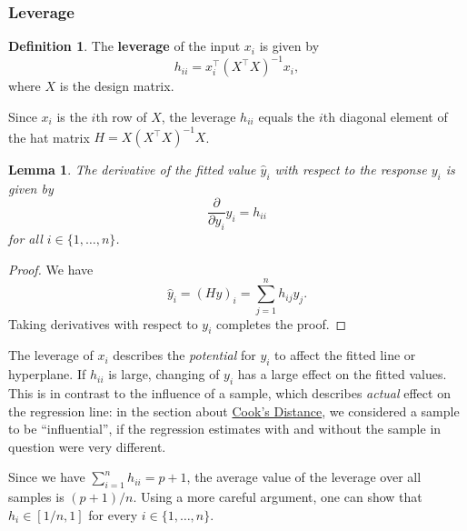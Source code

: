 \documentclass[
  a4paper,
]{article}
\newtheorem{lemma}{Lemma}[section]
\theoremstyle{definition}
\newtheorem{definition}{Definition}[section]
\theoremstyle{definition}
\theoremstyle{definition}
\theoremstyle{definition}
\theoremstyle{remark}
\begin{document}
\hypertarget{leverage}{%
\subsubsection{Leverage}\label{leverage}}

\begin{definition}
The \textbf{leverage} of the input \(x_i\) is given by
\begin{equation*}
  h_{ii}
  = x_i^\top (X^\top X)^{-1} x_i,
\end{equation*}
where \(X\) is the design matrix.
\end{definition}

Since \(x_i\) is the \(i\)th row of \(X\), the leverage \(h_{ii}\) equals the \(i\)th
diagonal element of the hat matrix \(H = X (X^\top X)^{-1} X\).

\begin{lemma}
The derivative of the fitted value \(\hat y_i\) with respect to the
response \(y_i\) is given by
\begin{equation*}
  \frac{\partial}{\partial y_i} \hat y_i
  = h_{ii}
\end{equation*}
for all \(i\in \{1, \ldots, n\}\).
\end{lemma}

\begin{proof}
We have
\begin{equation*}
  \hat y_i
  = (H y)_i
  = \sum_{j=1}^n h_{ij} y_j.
\end{equation*}
Taking derivatives with respect to \(y_i\) completes the proof.
\end{proof}

The leverage of \(x_i\) describes the \emph{potential} for \(y_i\) to affect the fitted
line or hyperplane. If \(h_{ii}\) is large, changing of \(y_i\) has a large effect
on the fitted values. This is in contrast to the influence of a sample, which
describes \emph{actual} effect on the regression line: in the section about \protect\hyperlink{influence}{Cook's
Distance}, we considered a sample to be ``influential'', if the regression
estimates with and without the sample in question were very different.

Since we have \(\sum_{i=1}^n h_{ii} = p+1\),
the average value of the leverage over all samples is \((p+1) / n\).
Using a more careful argument,
one can show that \(h_i \in [1/n, 1]\) for every \(i \in \{1, \ldots, n\}\).
\end{document}
